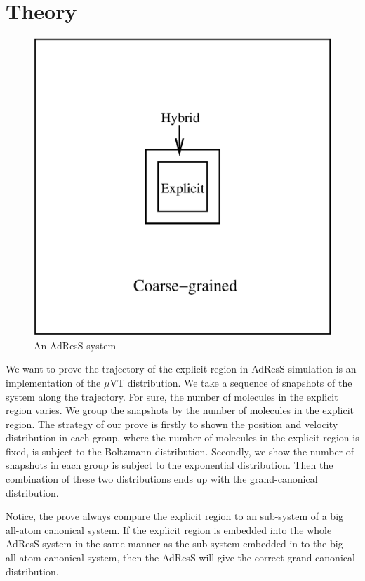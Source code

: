 \documentclass[aps,pre,preprint,unsortedaddress]{revtex4}
\begin{document}
\section{Theory}\label{sec:theory}


\begin{figure}
  \centering
  \includegraphics[width=.5\textwidth]{fig/system/system.eps}
  \caption{An AdResS system}
  \label{fig:tmp1}
\end{figure}


We want to prove the trajectory of the explicit region in AdResS
simulation is an implementation of the $\mu$VT distribution. We take a
sequence of snapshots of the system along the trajectory.  For sure,
the number of molecules in the explicit region varies. We group the
snapshots by the number of molecules in the explicit region.  The
strategy of our prove is firstly to shown the position and
velocity distribution in each group, where the number of molecules
in the explicit region is fixed, is subject to the Boltzmann
distribution. Secondly, we show the number of snapshots in each group
is subject to the exponential distribution. Then the combination of
these two distributions ends up with the grand-canonical distribution.

Notice, the prove always compare the explicit region to an sub-system
of a big all-atom canonical system. If the explicit region is embedded
into the whole AdResS system in the same manner as the sub-system
embedded in to the big all-atom canonical system, then the AdResS will
give the correct grand-canonical distribution.
\end{document}
